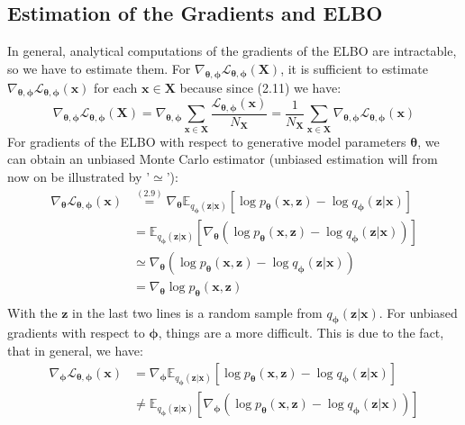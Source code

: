 \documentclass[12pt]{report}
\theoremstyle{definition}
\begin{document}
\subsection{Estimation of the Gradients and ELBO}
In general, analytical computations of the gradients of the ELBO are intractable, so we have to estimate them. For $\nabla_{\pmb{\theta}, \pmb{\phi}}\mathcal{L}_{\pmb{\theta}, \pmb{\phi}}(\mathbf{X})$, it is sufficient to estimate $\nabla_{\pmb{\theta}, \pmb{\phi}}\mathcal{L}_{\pmb{\theta}, \pmb{\phi}}(\mathbf{x})$ for each $\mathbf{x} \in \mathbf{X}$ because since (2.11) we have:
\begin{equation}
	\nabla_{\pmb{\theta}, \pmb{\phi}}\mathcal{L}_{\pmb{\theta}, \pmb{\phi}}(\mathbf{X}) = \nabla_{\pmb{\theta}, \pmb{\phi}}  \sum_{\mathbf{x} \in \mathbf{X}} \frac{\mathcal{L}_{\pmb{\theta}, \pmb{\phi}}(\mathbf{x})}{N_{\mathbf{X}}} = \frac{1}{N_{\mathbf{X}}} \sum_{\mathbf{x} \in \mathbf{X}} \nabla_{\pmb{\theta}, \pmb{\phi}} \mathcal{L}_{\pmb{\theta}, \pmb{\phi}}(\mathbf{x})
\end{equation}
For gradients of the ELBO with respect to generative model parameters $\pmb{\theta}$, we can obtain an unbiased Monte Carlo estimator (unbiased estimation will from now on be illustrated by '$\simeq$'):
\begin{equation}
\begin{split}
\nabla_{\pmb{\theta}}\mathcal{L}_{\pmb{\theta}, \pmb{\phi}}(\mathbf{x})
& \stackrel{(2.9)}{=} \nabla_{\pmb{\theta}} \mathbb{E}_{q_{\pmb{\phi}}(\mathbf{z}|\mathbf{x})}\left[ \log p_{\pmb{\theta}}(\mathbf{x}, \mathbf{z}) - \log q_{\pmb{\phi}}(\mathbf{z}|\mathbf{x}) \right]	\\
& = \mathbb{E}_{q_{\pmb{\phi}}(\mathbf{z}|\mathbf{x})}\left[ \nabla_{\pmb{\theta}} (\log p_{\pmb{\theta}}(\mathbf{x}, \mathbf{z}) - \log q_{\pmb{\phi}}(\mathbf{z}|\mathbf{x})) \right] \\
& \simeq \nabla_{\pmb{\theta}} (\log p_{\pmb{\theta}}(\mathbf{x}, \mathbf{z}) - \log q_{\pmb{\phi}}(\mathbf{z}|\mathbf{x})) \\
& = \nabla_{\pmb{\theta}} \log p_{\pmb{\theta}}(\mathbf{x}, \mathbf{z})\\
\end{split}
\end{equation}
With the $\mathbf{z}$ in the last two lines is a random sample from $q_{\pmb{\phi}}(\mathbf{z}|\mathbf{x})$. For unbiased gradients with respect to $\pmb{\phi}$, things are a more difficult. This is due to the fact, that in general, we have:
\begin{equation}
\begin{split}
\nabla_{\pmb{\phi}}\mathcal{L}_{\pmb{\theta}, \pmb{\phi}}(\mathbf{x})
& = \nabla_{\pmb{\phi}} \mathbb{E}_{q_{\pmb{\phi}}(\mathbf{z}|\mathbf{x})}\left[ \log p_{\pmb{\theta}}(\mathbf{x}, \mathbf{z}) - \log q_{\pmb{\phi}}(\mathbf{z}|\mathbf{x}) \right]	\\
& \neq \mathbb{E}_{q_{\pmb{\phi}}(\mathbf{z}|\mathbf{x})}\left[ \nabla_{\pmb{\phi}} (\log p_{\pmb{\theta}}(\mathbf{x}, \mathbf{z}) - \log q_{\pmb{\phi}}(\mathbf{z}|\mathbf{x})) \right] \\
\end{split}
\end{equation}
\end{document}
